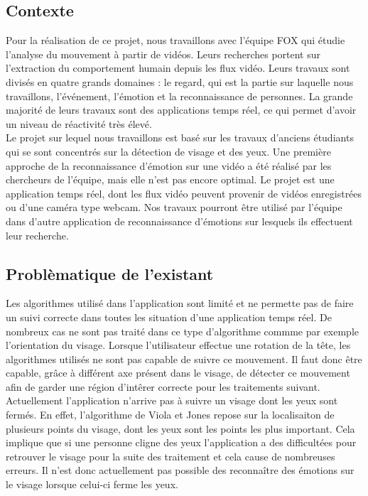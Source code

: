 \subsection{Contexte}
Pour la réalisation de ce projet, nous travaillons avec l'équipe FOX qui étudie
l'analyse du mouvement à partir de vidéos. Leurs recherches portent
sur l'extraction du comportement humain depuis les flux vidéo.  Leurs travaux sont
divisés en quatre grands domaines : le regard, qui est la partie sur laquelle nous travaillons, l'événement, l'émotion et la
reconnaissance de personnes. La grande majorité de leurs travaux sont
des applications temps réel, ce qui permet d'avoir un niveau de réactivité très élevé.\\ 

Le projet sur lequel nous travaillons est basé sur les travaux d'anciens étudiants qui se sont concentrés sur la
détection de visage et des yeux. Une première approche de la reconnaissance d'émotion sur une vidéo a été 
réalisé par les chercheurs de l'équipe, mais elle n'est pas encore optimal. Le projet est une application temps réel, 
dont les flux vidéo peuvent provenir de vidéos enregistrées ou d'une caméra type webcam. Nos travaux pourront être utilisé par
l'équipe dans d'autre application de reconnaissance d'émotions sur lesquels ils effectuent leur recherche.\\

\subsection{Problèmatique de l'existant}
Les algorithmes utilisé dans l'application sont limité et ne permette pas de faire un suivi correcte
dans toutes les situation d'une application temps réel. De nombreux cas ne sont
pas traité dans ce type d'algorithme commme par exemple l'orientation du visage. Lorsque
l'utilisateur effectue une rotation de la tête, les algorithmes utilisés ne sont pas capable
de suivre ce mouvement. Il faut donc être capable, grâce à différent axe présent dans le visage, de détecter
ce mouvement afin de garder une région d'intêrer correcte pour les traitements suivant.\\

Actuellement l'application n'arrive pas à suivre un visage dont les yeux sont fermés. En effet,
l'algorithme de Viola et Jones repose sur la localisaiton de plusieurs points du visage, dont 
les yeux sont les points les plus important. Cela implique que si une personne cligne des yeux
l'application a des difficultées pour retrouver le visage pour la suite des traitement et cela 
cause de nombreuses erreurs. Il n'est donc actuellement pas possible des reconnaître des émotions
sur le visage lorsque celui-ci ferme les yeux.\\

